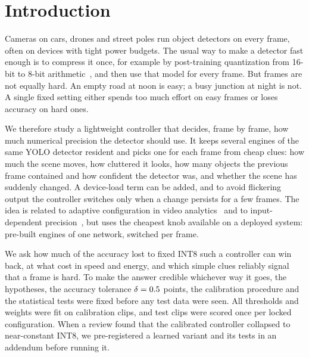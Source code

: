 \documentclass[pdflatex,sn-mathphys-num]{sn-jnl}
\begin{document}

\maketitle

\section{Introduction}\label{sec:intro}

Cameras on cars, drones and street poles run object detectors on every frame, often on devices with tight power budgets. The usual way to make a detector fast enough is to compress it once, for example by post-training quantization from 16-bit to 8-bit arithmetic~\cite{jacob2018quantization,nagel2021whitepaper}, and then use that model for every frame. But frames are not equally hard. An empty road at noon is easy; a busy junction at night is not. A single fixed setting either spends too much effort on easy frames or loses accuracy on hard ones.

We therefore study a lightweight controller that decides, frame by frame, how much numerical precision the detector should use. It keeps several engines of the same YOLO detector resident and picks one for each frame from cheap clues: how much the scene moves, how cluttered it looks, how many objects the previous frame contained and how confident the detector was, and whether the scene has suddenly changed. A device-load term can be added, and to avoid flickering output the controller switches only when a change persists for a few frames. The idea is related to adaptive configuration in video analytics~\cite{jiang2018chameleon,chin2019adascale,xu2020approxdet} and to input-dependent precision~\cite{liu2022dqnet,sun2021videoiq}, but uses the cheapest knob available on a deployed system: pre-built engines of one network, switched per frame.

We ask how much of the accuracy lost to fixed INT8 such a controller can win back, at what cost in speed and energy, and which simple clues reliably signal that a frame is hard. To make the answer credible whichever way it goes, the hypotheses, the accuracy tolerance $\delta = 0.5$ points, the calibration procedure and the statistical tests were fixed before any test data were seen. All thresholds and weights were fit on calibration clips, and test clips were scored once per locked configuration. When a review found that the calibrated controller collapsed to near-constant INT8, we pre-registered a learned variant and its tests in an addendum before running it.
\end{document}
